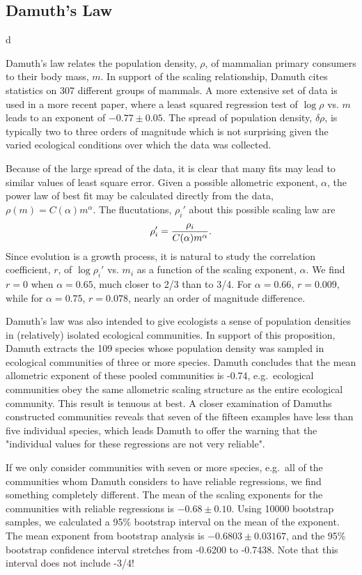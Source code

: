 \subsection{Damuth's Law}d

Damuth's law relates the population density, $\rho$, of mammalian primary consumers
to their body mass, $m$.  In support of the scaling relationship,
Damuth cites statistics on 307 different groups of mammals\cite{damuth81}.  A more extensive
set of data is used in a more recent paper\cite{damuth93}, where a least squared
regression test of $\log\rho$ vs. $m$ leads to an exponent of $-0.77 \pm 0.05$.
The spread of population density, $\delta\rho$, is typically two to three orders of magnitude
which is not surprising given the varied ecological conditions over which the data was collected.

Because of the large spread of the data, it is clear that many fits
may lead to similar values of least square error.  Given a possible allometric exponent,
$\alpha$, the power law of best fit may be calculated directly from the data,
$\rho(m)=C(\alpha)m^{\alpha}$.  The flucutations, $\rho_i'$ about this possible scaling law are
\begin{equation}
\rho_i'={\rho_i\over C(\alpha)m^{\alpha}}.
\end{equation}
Since evolution is a growth process, it is natural to study the correlation coefficient, $r$,
of $\log\rho_i'$ vs. $m_i$ as a function of the scaling exponent, $\alpha$.  We find $r=0$ 
when $\alpha=0.65$, much closer to 2/3 than to 3/4.  For $\alpha=0.66$, $r=0.009$, while
for $\alpha=0.75$, $r=0.078$, nearly an order of magnitude difference.  

Damuth's law was also intended to give ecologists
a sense of population densities in (relatively) isolated
ecological communities.  In support of this proposition, Damuth extracts the
109 species whose population density was sampled in ecological communities
of three or more species.  Damuth concludes that the mean allometric exponent
of these pooled communities is -0.74, e.g.\ ecological communities obey the 
same allometric scaling structure as the entire ecological community.
This result is tenuous at best.  A closer examination of Damuths constructed communities
reveals that seven of the fifteen examples have less than five individual species,
which leads Damuth to offer the warning that the "individual values for
these regressions are not very reliable".

If we only consider communities with seven or more species, e.g.\ all
of the communities whom Damuth considers to have reliable regressions,
we find something completely different.  The mean of the scaling exponents for the 
communities with reliable regressions is $-0.68\pm 0.10$.
Using 10000 bootstrap samples, we calculated a 95\% bootstrap interval on the 
mean of the exponent.  
The mean exponent from bootstrap analysis is $-0.6803\pm 0.03167$, and the 95\% bootstrap confidence 
interval stretches from -0.6200 to -0.7438.  Note that this interval does not include -3/4!

